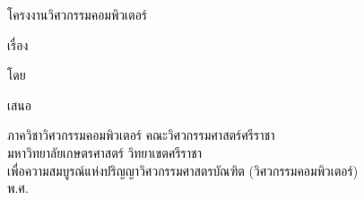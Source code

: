 \newpage
\begin{center}
โครงงานวิศวกรรมคอมพิวเตอร์

เรื่อง


\vfill
โดย


\vfill
เสนอ

ภาควิชาวิศวกรรมคอมพิวเตอร์ คณะวิศวกรรมศาสตร์ศรีราชา\\
มหาวิทยาลัยเกษตรศาสตร์ วิทยาเขตศรีราชา\\
เพื่อความสมบูรณ์แห่งปริญญาวิศวกรรมศาสตรบัณฑิต (วิศวกรรมคอมพิวเตอร์)\\
พ.ศ. \thisYear
\end{center}
